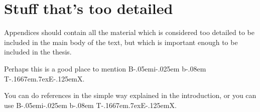 \documentclass[12pt,a4paper]{report}
\def\BibTeX{{\rm B\kern-.05em{\sc i\kern-.025em b}\kern-.08em
    T\kern-.1667em\lower.7ex\hbox{E}\kern-.125emX}}
\begin{document}

\appendix


\chapter{Stuff that's too detailed}

Appendices should contain all the material which is considered too
detailed to be included in the main body of the text, but which is
important enough to be included in the thesis.

Perhaps this is a good place to mention \BibTeX.

You can do references in the simple way explained in the introduction,
or you can use \BibTeX.




\end{document}
